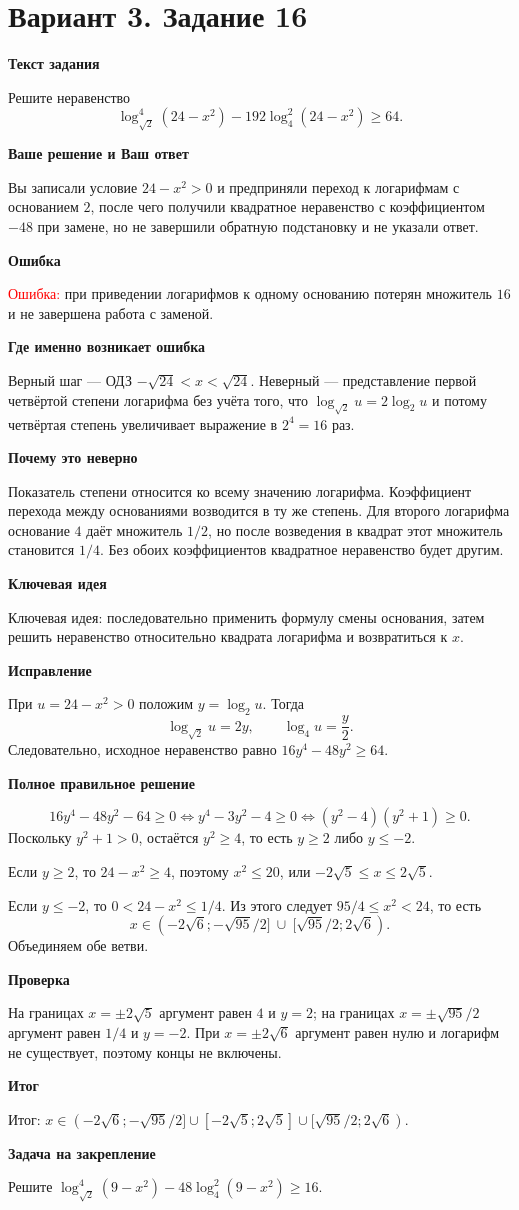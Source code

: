 \documentclass[11pt,a4paper]{article}
\newcommand{\Part}[1]{\par\medskip\noindent\textbf{#1}\par\smallskip}
\newcommand{\Task}[2]{\clearpage\phantomsection\label{task:#1}\section*{#2}}
\newcommand{\Err}[1]{\textcolor{red}{Ошибка:} #1}
\newcommand{\Idea}[1]{\textcolor{blue!60!black}{Ключевая идея:} #1}
\newcommand{\Result}[1]{\textcolor{teal!60!black}{Итог:} #1}
\begin{document}
\Task{v316}{Вариант 3. Задание 16}
\Part{Текст задания}
Решите неравенство
\[\log_{\sqrt2}^{4}(24-x^2)-192\log_4^{2}(24-x^2)\ge64.\]
\Part{Ваше решение и Ваш ответ}
Вы записали условие $24-x^2>0$ и предприняли переход к логарифмам с основанием $2$, после чего получили квадратное неравенство с коэффициентом $-48$ при замене, но не завершили обратную подстановку и не указали ответ.
\Part{Ошибка}
\Err{при приведении логарифмов к одному основанию потерян множитель $16$ и не завершена работа с заменой.}
\Part{Где именно возникает ошибка}
Верный шаг --- ОДЗ $-\sqrt{24}<x<\sqrt{24}$. Неверный --- представление первой четвёртой степени логарифма без учёта того, что $\log_{\sqrt2}u=2\log_2u$ и потому четвёртая степень увеличивает выражение в $2^4=16$ раз.
\Part{Почему это неверно}
Показатель степени относится ко всему значению логарифма. Коэффициент перехода между основаниями возводится в ту же степень. Для второго логарифма основание $4$ даёт множитель $1/2$, но после возведения в квадрат этот множитель становится $1/4$. Без обоих коэффициентов квадратное неравенство будет другим.
\Part{Ключевая идея}
\Idea{последовательно применить формулу смены основания, затем решить неравенство относительно квадрата логарифма и возвратиться к $x$.}
\Part{Исправление}
При $u=24-x^2>0$ положим $y=\log_2u$. Тогда
\[\log_{\sqrt2}u=2y,\qquad\log_4u=\frac y2.\]
Следовательно, исходное неравенство равно $16y^4-48y^2\ge64$.
\Part{Полное правильное решение}
\[16y^4-48y^2-64\ge0\iff y^4-3y^2-4\ge0\iff(y^2-4)(y^2+1)\ge0.\]
Поскольку $y^2+1>0$, остаётся $y^2\ge4$, то есть $y\ge2$ либо $y\le-2$.

Если $y\ge2$, то $24-x^2\ge4$, поэтому $x^2\le20$, или $-2\sqrt5\le x\le2\sqrt5$.

Если $y\le-2$, то $0<24-x^2\le1/4$. Из этого следует $95/4\le x^2<24$, то есть
\[x\in(-2\sqrt6;-\sqrt{95}/2]\ \cup\ [\sqrt{95}/2;2\sqrt6).\]
Объединяем обе ветви.
\Part{Проверка}
На границах $x=\pm2\sqrt5$ аргумент равен $4$ и $y=2$; на границах $x=\pm\sqrt{95}/2$ аргумент равен $1/4$ и $y=-2$. При $x=\pm2\sqrt6$ аргумент равен нулю и логарифм не существует, поэтому концы не включены.
\Part{Итог}
\Result{$x\in(-2\sqrt6;-\sqrt{95}/2]\cup[-2\sqrt5;2\sqrt5]\cup[\sqrt{95}/2;2\sqrt6)$.}
\Part{Задача на закрепление}
Решите $\log_{\sqrt2}^{4}(9-x^2)-48\log_4^{2}(9-x^2)\ge16$.
\end{document}
